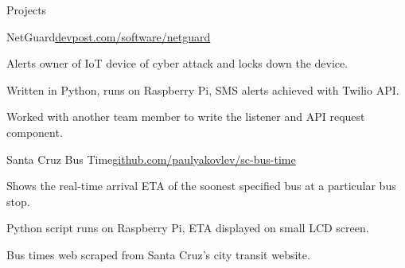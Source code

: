 \documentclass{resume} %
\begin{document}

\begin{rSection}{Projects}

\begin{rSubsection}{NetGuard}{\href{devpost.com/software/netguard}{devpost.com/software/netguard}}{}{}
    \item Alerts owner of IoT device of cyber attack and locks down the device.
    \item Written in Python, runs on Raspberry Pi, SMS alerts achieved with Twilio API.
    \item Worked with another team member to write the listener and API request component.
\end{rSubsection}

\begin{rSubsection}{Santa Cruz Bus Time}{\href{github.com/paulyakovlev\sc-bus-time}{github.com/paulyakovlev/sc-bus-time}}{}{}
    \item Shows the real-time arrival ETA of the soonest specified bus at a particular bus stop.
    \item Python script runs on Raspberry Pi, ETA displayed on small LCD screen.
    \item Bus times web scraped from Santa Cruz’s city transit website.
\end{rSubsection}

\end{rSection}










\end{document}
